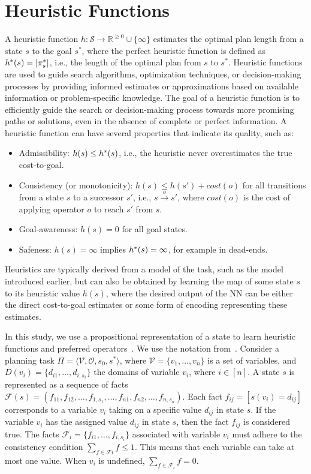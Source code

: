\documentclass[ppgc,diss,english]{iiufrgs}
\begin{document}
\section{Heuristic Functions}
\label{sec:background-heuristics}
A heuristic function $h:\mathcal{S}\rightarrow \mathbb{R}^{\geq 0}\cup\{\infty\}$ estimates the optimal plan length from a state $s$ to the goal $s^*$, where the perfect heuristic function is defined as $h^{*}(s) = |\pi_{s}^{*}|$, i.e., the length of the optimal plan from $s$ to $s^{*}$. Heuristic functions are used to guide search algorithms, optimization techniques, or decision-making processes by providing informed estimates or approximations based on available information or problem-specific knowledge. The goal of a heuristic function is to efficiently guide the search or decision-making process towards more promising paths or solutions, even in the absence of complete or perfect information. A heuristic function can have several properties that indicate its quality, such as:

\begin{itemize}
\item Admissibility: $h(s) \le h^{*}{(s)}$, i.e., the heuristic never overestimates the true cost-to-goal.
\item Consistency (or monotonicity): $h(s) \le h(s') + cost(o)$ for all transitions from a state $s$ to a successor $s'$, i.e., $s \xrightarrow{o} s'$, where $cost(o)$ is the cost of applying operator $o$ to reach $s'$ from $s$.
\item Goal-awareness: $h(s) = 0$ for all goal states.
\item Safeness: $h(s) = \infty$ implies $h^{*} (s) = \infty$, for example in dead-ends.
\end{itemize}

Heuristics are typically derived from a model of the task, such as the \sas model introduced earlier, but can also be obtained by learning the map of some state $s$ to its heuristic value $h(s)$, where the desired output of the NN can be either the direct cost-to-goal estimates or some form of encoding representing these estimates.

In this study, we use a propositional representation of a state to learn heuristic functions and preferred operators~\cite{Ferber.etal/2020a,Yu.etal/2020,Ferber.etal/2022,OToole/2022,Bettker.etal/2022}. We use the notation from~\citet{Bettker.etal/2022}.
Consider a planning task $\Pi=\langle\mathcal{V},\mathcal{O},s_0,s^*\rangle$, where $\mathcal{V}=\{v_1,\ldots,v_n\}$ is a set of variables, and $D(v_i)=\{d_{i1},\ldots,d_{i,s_i}\}$ the domains of variable $v_i$, where $i\in[n]$.
A state $s$ is represented as a sequence of facts $\mathcal{F}(s)=(f_{11},f_{12},\ldots,f_{1,s_1},\ldots,f_{n1},f_{n2},\ldots,f_{n,s_n})$. Each fact $f_{ij}=[s(v_i)=d_{ij}]$ corresponds to a variable $v_i$ taking on a specific value $d_{ij}$ in state $s$. If the variable $v_i$ has the assigned value $d_{ij}$ in state $s$, then the fact $f_{ij}$ is considered true.
The facts $\mathcal{F}_{i}=\{f_{i1},\ldots,f_{i,s_i}\}$ associated with variable $v_i$ must adhere to the consistency condition $\sum_{f\in \mathcal{F}i} f\leq 1$. This means that each variable can take at most one value. When $v_i$ is undefined, $\sum_{f\in \mathcal{F}_i} f=0$.
\end{document}
